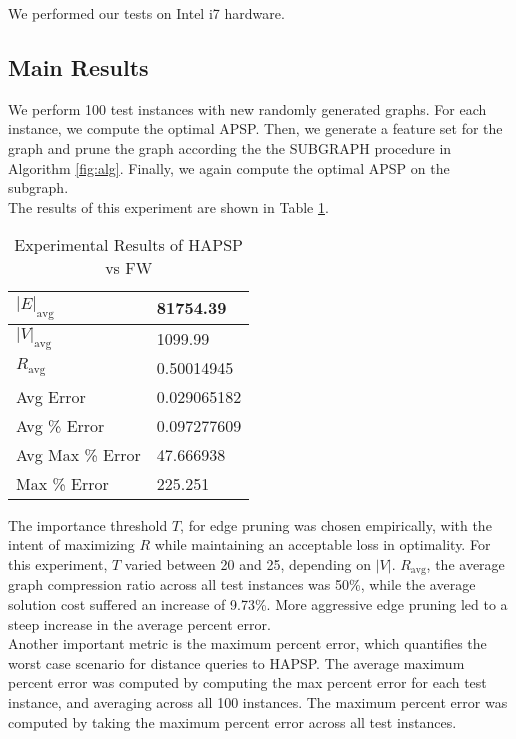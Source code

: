 \documentclass[10.5pt,journal]{IEEEtran}
\begin{document}
		We performed our tests on Intel i7 hardware. 
		
	\subsection{Main Results}
		
		We perform 100 test instances with new randomly generated graphs. For each instance, we
		compute the optimal APSP. Then, we generate a feature set for the graph and prune the graph
		according the the SUBGRAPH procedure in Algorithm \ref{fig:alg}. Finally, we again compute
		the optimal APSP on the subgraph. \\
		
		The results of this experiment are shown in Table \ref{fig:main_tbl}.
		
		\begin{table}[h!] \normalsize
		\centering
		\caption{Experimental Results of HAPSP vs FW}
		\label{my-label}
 		\begin{tabular}{|l|l|} 								\hline
		$|E|_{\mbox{avg}}$              & 81754.39			\\\hline
		$|V|_{\mbox{avg}}$              & 1099.99			\\\hline
		$R_{\mbox{avg}}$                & 0.50014945		\\\hline
		Avg Error         				& 0.029065182		\\\hline
		Avg \% Error 					& 0.097277609		\\\hline
		Avg Max \% Error      			& 47.666938			\\\hline
		Max \% Error			        & 225.251			\\\hline
		\end{tabular}
		\label{fig:main_tbl}
		\end{table}
	
		The importance threshold $T$, for edge pruning was chosen empirically, with the intent of
		maximizing $R$ while maintaining an acceptable loss in optimality. For this experiment,
		$T$ varied between 20 and 25, depending on $|V|$. 
		$R_{\mbox{avg}}$, the average graph compression ratio across all test instances was 50\%, while
		the average solution cost suffered an increase of 9.73\%. More aggressive edge pruning led to
		a steep increase in the average percent error. \\
		
		Another important metric is the maximum percent error, which quantifies the worst case scenario
		for distance queries to HAPSP. The average maximum percent error was computed by computing the
		max percent error for each test instance, and averaging across all 100 instances. The maximum
		percent error was computed by taking the maximum percent error across all test instances. \\
		
\end{document}
